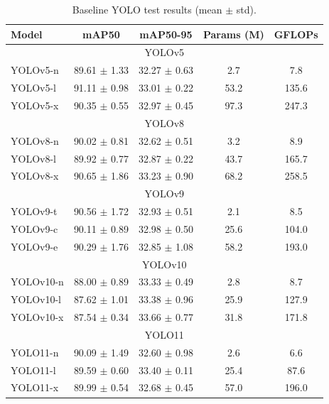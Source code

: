 \documentclass{article}
\begin{document}
\begin{table}[htbp]
\centering
\renewcommand{\arraystretch}{1.12}
\caption{Baseline YOLO test results (mean $\pm$ std).}
\label{tab:yolo-baselines}
\begin{tabular*}{\textwidth}{@{\extracolsep{\fill}}lcccc}
\toprule
Model & mAP50 & mAP50-95 & Params (M) & GFLOPs \\
\midrule

\multicolumn{5}{c}{YOLOv5} \\
\midrule
YOLOv5-n & 89.61 $\pm$ 1.33 & 32.27 $\pm$ 0.63 & 2.7 & 7.8 \\
YOLOv5-l & 91.11 $\pm$ 0.98 & 33.01 $\pm$ 0.22 & 53.2 & 135.6 \\
YOLOv5-x & 90.35 $\pm$ 0.55 & 32.97 $\pm$ 0.45 & 97.3 & 247.3 \\
\midrule
\multicolumn{5}{c}{YOLOv8} \\
\midrule
YOLOv8-n & 90.02 $\pm$ 0.81 & 32.62 $\pm$ 0.51 & 3.2 & 8.9 \\
YOLOv8-l & 89.92 $\pm$ 0.77 & 32.87 $\pm$ 0.22 & 43.7 & 165.7 \\
YOLOv8-x & 90.65 $\pm$ 1.86 & 33.23 $\pm$ 0.90 & 68.2 & 258.5 \\
\midrule
\multicolumn{5}{c}{YOLOv9} \\
\midrule
YOLOv9-t & 90.56 $\pm$ 1.72 & 32.93 $\pm$ 0.51 & 2.1 & 8.5 \\
YOLOv9-c & 90.11 $\pm$ 0.89 & 32.98 $\pm$ 0.50 & 25.6 & 104.0 \\
YOLOv9-e & 90.29 $\pm$ 1.76 & 32.85 $\pm$ 1.08 & 58.2 & 193.0 \\
\midrule
\multicolumn{5}{c}{YOLOv10} \\
\midrule
YOLOv10-n & 88.00 $\pm$ 0.89 & 33.33 $\pm$ 0.49 & 2.8 & 8.7 \\
YOLOv10-l & 87.62 $\pm$ 1.01 & 33.38 $\pm$ 0.96 & 25.9 & 127.9 \\
YOLOv10-x & 87.54 $\pm$ 0.34 & 33.66 $\pm$ 0.77 & 31.8 & 171.8 \\
\midrule
\multicolumn{5}{c}{YOLO11} \\
\midrule
YOLO11-n & 90.09 $\pm$ 1.49 & 32.60 $\pm$ 0.98 & 2.6 & 6.6 \\
YOLO11-l & 89.59 $\pm$ 0.60 & 33.40 $\pm$ 0.11 & 25.4 & 87.6 \\
YOLO11-x & 89.99 $\pm$ 0.54 & 32.68 $\pm$ 0.45 & 57.0 & 196.0 \\
\bottomrule
\end{tabular*}
\end{table}
\end{document}
